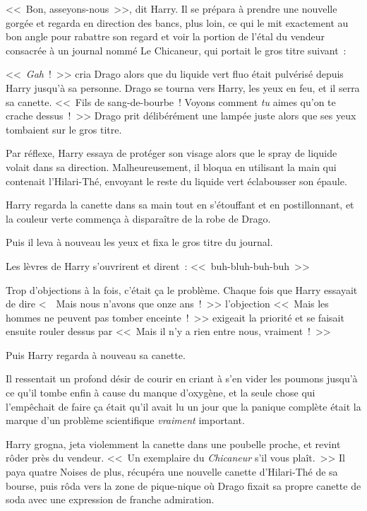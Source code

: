 <<~Bon, asseyons-nous~>>, dit Harry. Il se prépara à prendre une nouvelle gorgée et regarda en direction des bancs, plus loin, ce qui le mit exactement au bon angle pour rabattre son regard et voir la portion de l'étal du vendeur consacrée à un journal nommé Le Chicaneur, qui portait le gros titre suivant~:


<<~\emph{Gah}~!~>> cria Drago alors que du liquide vert fluo était pulvérisé depuis Harry jusqu'à sa personne. Drago se tourna vers Harry, les yeux en feu, et il serra sa canette. <<~Fils de sang-de-bourbe~! Voyons comment \emph{tu} aimes qu'on te crache dessus~!~>> Drago prit délibérément une lampée juste alors que ses yeux tombaient sur le gros titre.

Par réflexe, Harry essaya de protéger son visage alors que le spray de liquide volait dans sa direction. Malheureusement, il bloqua en utilisant la main qui contenait l'Hilari-Thé, envoyant le reste du liquide vert éclabousser son épaule.

Harry regarda la canette dans sa main tout en s'étouffant et en postillonnant, et la couleur verte commença à disparaître de la robe de Drago.

Puis il leva à nouveau les yeux et fixa le gros titre du journal.


Les lèvres de Harry s'ouvrirent et dirent~: <<~buh-bluh-buh-buh~>>

Trop d'objections à la fois, c'était ça le problème. Chaque fois que Harry essayait de dire <~~Mais nous n'avons que onze ans~!~>> l'objection <<~Mais les hommes ne peuvent pas tomber enceinte~!~>> exigeait la priorité et se faisait ensuite rouler dessus par <<~Mais il n'y a rien entre nous, vraiment~!~>>

Puis Harry regarda à nouveau sa canette.

Il ressentait un profond désir de courir en criant à s'en vider les poumons jusqu'à ce qu'il tombe enfin à cause du manque d'oxygène, et la seule chose qui l'empêchait de faire ça était qu'il avait lu un jour que la panique complète était la marque d'un problème scientifique \emph{vraiment} important.

Harry grogna, jeta violemment la canette dans une poubelle proche, et revint rôder près du vendeur. <<~Un exemplaire du \emph{Chicaneur} s'il vous plaît.~>> Il paya quatre Noises de plus, récupéra une nouvelle canette d'Hilari-Thé de sa bourse, puis rôda vers la zone de pique-nique où Drago fixait sa propre canette de soda avec une expression de franche admiration.

